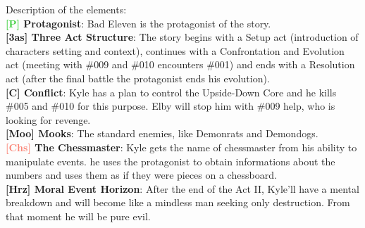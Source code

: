 Description of the elements:\\
\textbf{\textcolor{LimeGreen}{[P]} Protagonist}: Bad Eleven is the protagonist of the story.\\
\textbf{\textcolor{dark-gray}{[3as]} Three Act Structure}: The story begins with a Setup act (introduction of characters setting and context), continues with a Confrontation and Evolution act (meeting with \#009 and \#010 encounters \#001) and ends with a Resolution act (after the final battle the protagonist ends his evolution).\\
\textbf{\textcolor{dark-gray}{[C]} Conflict}: Kyle has a plan to control the Upside-Down Core and he kills \#005 and \#010 for this purpose. Elby will stop him with \#009 help, who is looking for revenge.\\
\textbf{\textcolor{OliveGreen}{[Moo]} Mooks}: The standard enemies, like Demonrats and Demondogs.\\
\textbf{\textcolor{Salmon}{[Chs]} The Chessmaster}: Kyle gets the name of chessmaster from his ability to manipulate events. he uses the protagonist to obtain informations about the numbers and uses them as if they were pieces on a chessboard.\\
\textbf{\textcolor{light-gray}{[Hrz]} Moral Event Horizon}: After the end of the Act II, Kyle'll have a mental breakdown and will become like a mindless man seeking only destruction. From that moment he will be pure evil.\\
